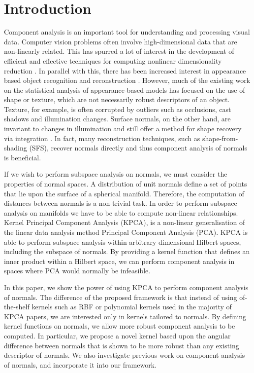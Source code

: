 \section{Introduction}\label{sec:intro}
Component analysis is an important tool for understanding and processing visual data. Computer vision problems often involve high-dimensional data that are non-linearly related. This has spurred a lot of interest in the development of efficient and effective techniques for computing nonlinear dimensionality reduction \cite{RefWorks:91,RefWorks:92,RefWorks:93,RefWorks:94}. In parallel with this, there has been increased interest in appearance based object recognition and reconstruction \cite{RefWorks:95,RefWorks:96,RefWorks:97,RefWorks:98}. %
However, much of the existing work on the statistical analysis of appearance-based models has focused on the use of shape or texture, which are not necessarily robust descriptors of an object. Texture, for example, is often corrupted by outliers such as occlusions, cast shadows and illumination changes. 
Surface normals, on the other hand, are invariant to changes in illumination and still offer a method for shape recovery via integration \cite{RefWorks:99}. In fact, many reconstruction techniques, such as shape-from-shading (SFS)\cite{RefWorks:230, RefWorks:252, RefWorks:225}, recover normals directly and thus component analysis of normals is beneficial.

If we wish to perform subspace analysis on normals, we must consider the properties of normal spaces. A distribution of unit normals define a set of points that lie upon the surface of a spherical manifold. Therefore, the computation of distances between normals is a non-trivial task. In order to perform subspace analysis on manifolds we have to be able to compute non-linear relationships. 
Kernel Principal Component Analysis (KPCA), is a non-linear generalisation of the linear data analysis method Principal Component Analysis (PCA). KPCA is able to perform subspace analysis within arbitrary dimensional Hilbert spaces, including the subspace of normals. By providing a kernel function that defines an inner product within a Hilbert space, we can perform component analysis in spaces where PCA would normally be infeasible. 

In this paper, we show the power of using KPCA to perform component analysis of normals. The difference of the proposed framework is that instead of using of-the-shelf kernels such as RBF or polynomial kernels used in the majority of KPCA papers, we are interested only in kernels tailored to normals. By defining kernel functions on normals, we allow more robust component analysis to be computed. In particular, we propose a novel kernel based upon the angular difference between normals that is shown to be more robust than any existing descriptor of normals. We also investigate previous work on component analysis of normals, and incorporate it into our framework.

